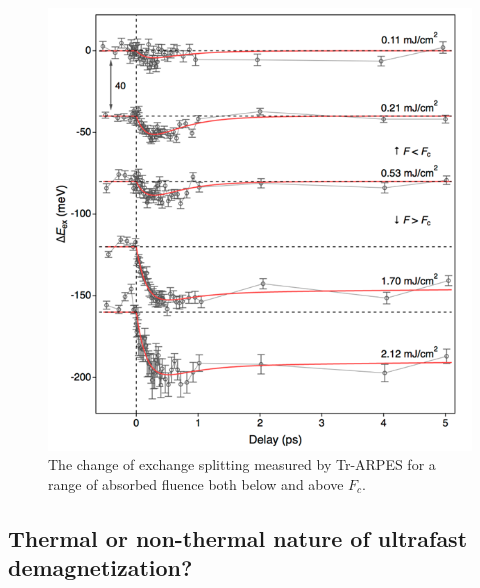 \begin{figure}
	\label{fig: PRLSI3}
	\begin{center}
		\includegraphics[width=120mm]{figs/PRLSI3}
	\end{center}
	\caption{The change of exchange splitting measured by Tr-ARPES for a range of absorbed fluence both below and above $F_c$.}
\end{figure}

\subsection{Thermal or non-thermal nature of ultrafast demagnetization?}

